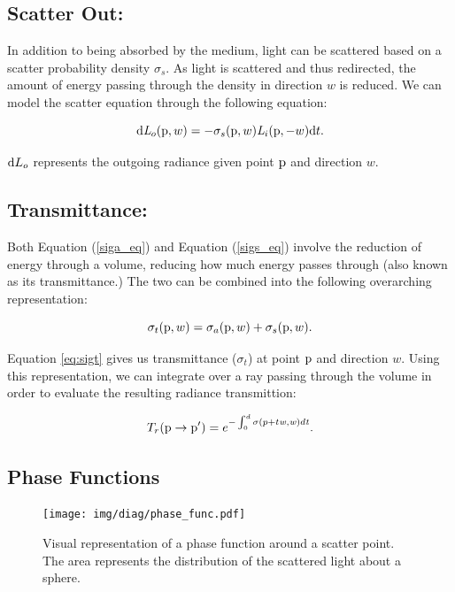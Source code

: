 \documentclass[12pt]{ucthesis}
\newcommand{\captionfonts}{\small\bf\ssp}
\begin{document}
\subsection{Scatter Out:}
In addition to being absorbed by the medium, light can be scattered based on a scatter probability density $\sigma_{s}$.  As light is scattered and thus redirected, the amount of energy passing through the density in direction $w$ is reduced.  We can model the scatter equation through the following equation:

\begin{equation}
\textup{d}\mathit{L}_{o}(\textup{p},w) = -\sigma_{s}(\textup{p},w) \mathit{L}_{i}(\textup{p},-w)\textup{d}t.
\label{sigs_eq}
\end{equation}

$\textup{d}L_{o}$ represents the outgoing radiance given point $\textup{p}$ and direction $w$.

\subsection{Transmittance:}
Both Equation (\ref{siga_eq}) and Equation (\ref{sigs_eq}) involve the reduction of energy through a volume, reducing how much energy passes through (also known as its transmittance.)  The two can be combined into the following overarching representation:

\begin{equation}
\sigma_{t}(\textup{p},w) = \sigma_{a}(\textup{p},w) + \sigma_{s}(\textup{p}, w).
\label{eq:sigt}
\end{equation}

Equation \ref{eq:sigt} gives us transmittance ($\sigma_{t}$) at point $\textup{p}$ and direction $w$.  Using this representation, we can integrate over a ray passing through the volume in order to evaluate the resulting radiance transmittion:

\begin{equation}
T_{r}(\textup{p} \to \textup{p}') = e^{-\int_{0}^{d}\sigma (p+t\mathit{w},\mathit{w})d\mathit{t}}.
\label{transmittion_eq}
\end{equation}

\subsection{Phase Functions}

\begin{figure}[h!]
    \centering
    \texttt{[image: img/diag/phase\_func.pdf]}
    \captionfonts
    \caption{Visual representation of a phase function around a scatter point.  The area represents the distribution of the scattered light about a sphere.}
    \label{fig:phase}
\end{figure}
\end{document}
